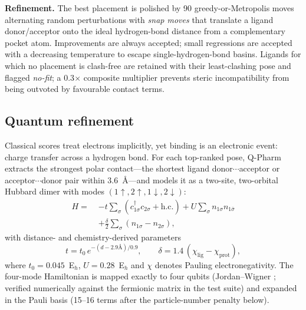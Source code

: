 \documentclass[10pt,a4paper,twocolumn]{article}
\begin{document}
\textbf{Refinement.} The best placement is polished by 90 greedy-or-Metropolis moves
alternating random perturbations with \emph{snap moves} that translate a ligand
donor/acceptor onto the ideal hydrogen-bond distance from a complementary pocket atom.
Improvements are always accepted; small regressions are accepted with a decreasing
temperature to escape single-hydrogen-bond basins. Ligands for which no placement is
clash-free are retained with their least-clashing pose and flagged \emph{no-fit}; a
0.3$\times$ composite multiplier prevents steric incompatibility from being outvoted by
favourable contact terms.

\subsection{Quantum refinement}
\label{sec:quantum}

Classical scores treat electrons implicitly, yet binding is an electronic event: charge
transfer across a hydrogen bond. For each top-ranked pose, Q-Pharm extracts the strongest
polar contact---the shortest ligand donor$\cdots$acceptor or acceptor$\cdots$donor pair
within 3.6~\AA---and models it as a two-site, two-orbital Hubbard dimer with modes
$(1\uparrow, 2\uparrow, 1\downarrow, 2\downarrow)$:
\begin{equation}
\begin{aligned}
H = \; & -t \sum_\sigma \left(c^\dagger_{1\sigma} c_{2\sigma} + \text{h.c.}\right)
       + U \sum_\sigma n_{1\sigma} n_{1\bar\sigma} \\
       & + \frac{\delta}{2} \sum_\sigma (n_{1\sigma} - n_{2\sigma}),
\end{aligned}
\label{eq:hubbard}
\end{equation}
with distance- and chemistry-derived parameters
\begin{equation}
t = t_0\, e^{-(d - 2.9\text{\AA})/0.9}, \qquad
\delta = 1.4\,(\chi_{\text{lig}} - \chi_{\text{prot}}),
\end{equation}
where $t_0 = 0.045$~E$_h$, $U = 0.28$~E$_h$ and $\chi$ denotes Pauling electronegativity.
The four-mode Hamiltonian is mapped exactly to four qubits (Jordan--Wigner
\cite{jordanwigner1928}; verified numerically against the fermionic matrix in the test
suite) and expanded in the Pauli basis (15--16 terms after the particle-number penalty
below).
\end{document}

